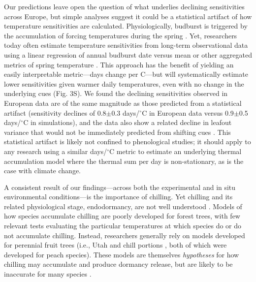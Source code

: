 \documentclass{article}
\begin{document}
\par Our predictions leave open the question of what underlies declining sensitivities across Europe, but simple analyses suggest it could be a statistical artifact of how temperature sensitivities are calculated. Physiologically, budburst is triggered by the accumulation of forcing temperatures during the spring \citep{hanninen1995,chuine2016}. Yet, researchers today often estimate temperature sensitivities from long-term observational data using a linear regression of annual budburst date versus mean or other aggregated metrics of spring temperature \citep[e.g.,][]{Wolkovich:2012n}. This approach has the benefit of yielding an easily interpretable metric---days change per \degree C---but will systematically estimate lower sensitivities given warmer daily temperatures, even with no change in the underlying cues (Fig. 3S). We found the declining sensitivities observed in European data are of the same magnitude as those predicted from a statistical artifact (sensitivity declines of 0.8$\pm$0.3 days/$^{\circ}$C in European data versus 0.9$\pm$0.5 days/$^{\circ}$C in simulations), and the data also show a related decline in leafout variance that would not be immediately predicted from shifting cues \citep[see \emph{Potential statistical artifacts in declines of temperature sensitivity observational long-term data} in the Supplemental Materials and ][for further details]{gusewell2017}. This statistical artifact is likely not confined to phenological studies; it should apply to any research using a similar days/$^{\circ}$C metric to estimate an underlying thermal accumulation model where the thermal sum per day is non-stationary, as is the case with climate change. 

\par A consistent result of our findings---across both the experimental and in situ environmental conditions---is the importance of chilling. Yet chilling and its related physiological stage, endodormancy, are not well understood \citep{chuine2016}. Models of how species accumulate chilling are poorly developed for forest trees, with few relevant tests evaluating the particular temperatures at which species do or do not accumulate chilling. Instead, researchers generally rely on models developed for perennial fruit trees (i.e., Utah \citep{richardson1974} and chill portions \citep{fishman1987}, both of which were developed for peach species). These models are themselves \emph{hypotheses} for how chilling may accumulate and produce dormancy release, but are likely to be inaccurate for many species \citep{dennis2003}. 
\end{document}
